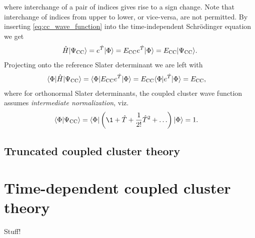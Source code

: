         where interchange of a pair of indices gives rise to a sign change.
        Note that interchange of indices from upper to lower, or vice-versa, are
        not permitted.
        By inserting \autoref{eq:cc_wave_function} into the time-independent
        Schrödinger equation we get
        \begin{align}
            \hat{H}| \Psi_{\text{CC}} \rangle
            = e^{\hat{T}}| \Phi \rangle
            = E_{\text{CC}} e^{\hat{T}}| \Phi \rangle
            = E_{\text{CC}} | \Psi_{\text{CC}} \rangle.
        \end{align}
        Projecting onto the reference Slater determinant we are left with
        \begin{align}
            \langle \Phi |\hat{H}| \Psi_{\text{CC}} \rangle
            &= \langle \Phi |E_{\text{CC}} e^{\hat{T}}| \Phi \rangle
            = E_{\text{CC}} \langle \Phi | e^{\hat{T}}| \Phi \rangle
            = E_{\text{CC}},
        \end{align}
        where for orthonormal Slater determinants, the coupled cluster wave
        function assumes \emph{intermediate normalization}, viz.
        \begin{align}
            \braket{\slat}{\cc}
            &= \bra{\slat}\para{
                \1 + \clust + \frac{1}{2!}\clust^2 + \dots
            }\ket{\slat}
            = 1.
        \end{align}


        \subsection{Truncated coupled cluster theory}

    \section{Time-dependent coupled cluster theory}
        Stuff!


